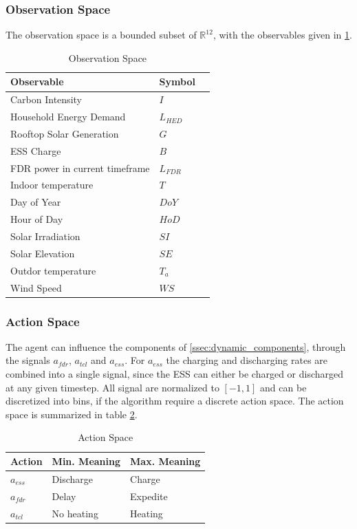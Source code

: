 \subsubsection{Observation Space}
The observation space is a bounded subset of $\mathbb{R}^{12}$, with the observables given in \ref{tab:observation_space}. 
\begin{table}[H]
    \centering
    \begin{tabular}{lll}
    \textbf{Observable} & \textbf{Symbol} \\
    \hline
    Carbon Intensity & $I$\\
    Household Energy Demand & $L_{HED}$ \\
    Rooftop Solar Generation & $G$ \\
    ESS Charge & $B$ \\
    FDR power in current timeframe & $L_{FDR}$ \\
    Indoor temperature & $T$ \\
    Day of Year & $DoY$ \\
    Hour of Day & $HoD$ \\
    Solar Irradiation & $SI$ \\
    Solar Elevation & $SE$ \\
    Outdor temperature & $T_a$ \\
    Wind Speed & $WS$ \\
    \end{tabular}
    \caption{Observation Space}
    \label{tab:observation_space}
\end{table}

\subsubsection{Action Space}
The agent can influence the components of \ref{ssec:dynamic_components}, through the signals $a_{fdr}$, $a_{tcl}$ and $a_{ess}$. For $a_{ess}$ the charging and discharging rates are combined into a single signal, since the ESS can either be charged or discharged at any given timestep. 
All signal are normalized to $[-1, 1]$ and can be discretized into bins, if the algorithm require a discrete action space. The action space is summarized in table \ref{tab:action_space}.
\begin{table}[H]
    \centering
    \begin{tabular}{lll}
    \textbf{Action} & \textbf{Min. Meaning} & \textbf{Max. Meaning}\\
    \hline
    $a_{ess}$ & Discharge & Charge \\ 
    $a_{fdr}$ & Delay     & Expedite \\
    $a_{tcl}$ & No heating& Heating\\
    \end{tabular}
    \caption{Action Space}
    \label{tab:action_space}
\end{table}

